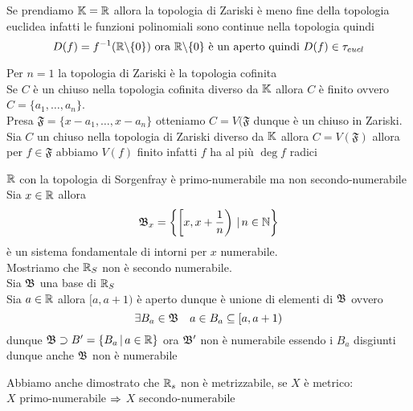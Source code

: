 \begin{oss}Se prendiamo $\mathbb{K}=\mathbb{R}$ allora la topologia di Zariski \`e meno  fine della topologia euclidea infatti le funzioni polinomiali sono continue nella topologia quindi 
$$ D(f)=f^{-1}( \mathbb{R} \backslash \{ 0\}) \text{ ora } \mathbb{R} \backslash \{0\} \text{ \`e un aperto quindi } D(f) \in \tau_{eucl}$$
\end{oss}
\begin{oss}Per $n=1$ la topologia di Zariski \`e la topologia cofinita\\

Se $C$ \`e un chiuso nella topologia cofinita diverso da $\mathbb{K}$ allora $C$ \`e finito ovvero $C=\{ a_1, \dots , a_n\}$.\\
Presa $\mathfrak{F}=\{ x-a_1, \dots, x-a_n\}$ otteniamo $C=V(\mathfrak{F}$ dunque \`e un chiuso in Zariski.\\
Sia $C$ un chiuso nella topologia di Zariski diverso da $\mathbb{K}$ allora $C=V(\mathfrak{F})$ allora per $f\in \mathfrak{F}$ abbiamo $V(f)$ finito infatti $f$ ha al pi\`u $\deg f$ radici
\end{oss}
\newpage
\begin{ex}$\mathbb{R}$ con la topologia di Sorgenfray \`e primo-numerabile ma non secondo-numerabile\\
Sia $x\in \mathbb{R}$ allora $$\mathfrak{B}_x=\left\{ \left[x, x+\frac{1}{n}\right) \, \vert \, n \in \mathbb{N} \right\}$$ \`e un sistema fondamentale di intorni per $x$ numerabile.\\
Mostriamo che $\mathbb{R}_S$ non \`e secondo numerabile.\\
Sia $\mathfrak{B}$ una base di $\mathbb{R}_S$\\
Sia $a\in \mathbb{R}$ allora $[a,a+1) $ \`e aperto dunque \`e unione di elementi di $\mathfrak{B}$ ovvero $$\exists B_a \in \mathfrak{B} \quad a\in B_a\subseteq [a,a+1)$$ dunque
$\mathfrak{B} \supset B'=\{ B_a \, \vert \, a \in \mathbb{R}\}$ ora $\mathfrak{B}'$ non \`e numerabile essendo i $B_a$ disgiunti dunque anche $\mathfrak{B}$ non \`e numerabile
\begin{oss}Abbiamo anche dimostrato che $\mathbb{R}_s$ non \`e metrizzabile, se $X$ \`e metrico:\\$X$ primo-numerabile $\Rightarrow $ $X$ secondo-numerabile
\end{oss}
\end{ex}
\spazio
